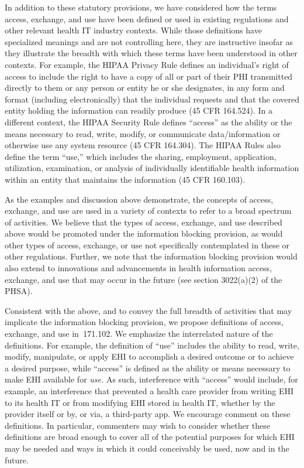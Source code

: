 \documentclass[twoside,11pt]{article}
\begin{document}
          In addition to these statutory provisions, we have considered how the terms access, exchange, and use have been defined or used in existing regulations and other relevant health IT industry contexts. While those definitions have specialized meanings and are not controlling here, they are instructive insofar as they illustrate the breadth with which these terms have been understood in other contexts. For example, the HIPAA Privacy Rule defines an individual's right of access to include the right to have a copy of all or part of their PHI transmitted directly to them or any person or entity he or she designates, in any form and format (including electronically) that the individual requests and that the covered entity holding the information can readily produce (45 CFR 164.524). In a different context, the HIPAA Security Rule defines “access” as the ability or the means necessary to read, write, modify, or communicate data/information or otherwise use any system resource (45 CFR 164.304). The HIPAA Rules also define the term “use,” which includes the sharing, employment, application, utilization, examination, or analysis of individually identifiable health information within an entity that maintains the information (45 CFR 160.103).


          As the examples and discussion above demonstrate, the concepts of access, exchange, and use are used in a variety of contexts to refer to a broad spectrum of activities. We believe that the types of access, exchange, and use described above would be promoted under the information blocking provision, as would other types of access, exchange, or use not specifically contemplated in these or other regulations. Further, we note that the information blocking provision would also extend to innovations and advancements in health information access, exchange, and use that may occur in the future (see section 3022(a)(2) of the PHSA).



          Consistent with the above, and to convey the full breadth of activities that may implicate the information blocking provision, we propose definitions of access, exchange, and use in \textsection{} 171.102. We emphasize the interrelated nature of the definitions. For example, the definition of “use” includes the ability to read, write, modify, manipulate, or apply EHI to accomplish a desired outcome or to achieve a desired purpose, while “access” is defined as the ability or means necessary to make EHI available for \emph{use.} As such, interference with “access” would include, for example, an interference that prevented a health care provider from writing EHI to its health IT or from modifying EHI stored in health IT, whether by the provider itself or by, or via, a third-party app. We encourage comment on these definitions. In particular, commenters may wish to consider whether these definitions are broad enough to cover all of the potential purposes for which EHI may be needed and ways in which it could conceivably be used, now and in the future.
\end{document}
